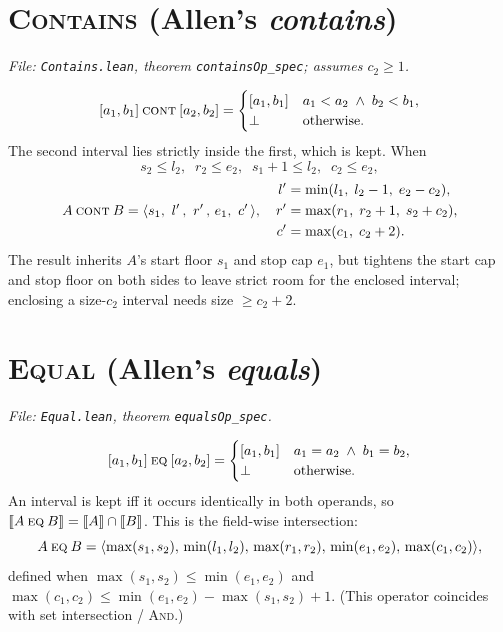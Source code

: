 \documentclass[11pt]{article}
\newcommand{\sem}[1]{\llbracket #1 \rrbracket}            %
\newcommand{\Empty}{\bot}                                 %
\newcommand{\R}[5]{\langle #1,\, #2,\, #3,\, #4,\, #5 \rangle} %
\newcommand{\opname}[1]{\mathbin{\textsc{#1}}}
\newcommand{\Cont}{\opname{cont}}                         %
\newcommand{\Eq}{\opname{eq}}                             %
\theoremstyle{definition}
\theoremstyle{plain}
\begin{document}
\section{\textsc{Contains} (Allen's \emph{contains})}
\label{sec:contains}
\textit{File: \texttt{Contains.lean}, theorem \texttt{containsOp\_spec}; assumes
$c_2\ge1$.}

\[
  [a_1,b_1] \Cont [a_2,b_2] =
  \begin{cases} [a_1,b_1] & a_1 < a_2 \;\wedge\; b_2 < b_1,\\
                \Empty & \text{otherwise.}\end{cases}
\]
The second interval lies strictly inside the first, which is kept.  When
\[
  s_2 \le l_2,\;\; r_2 \le e_2,\;\; s_1+1 \le l_2,\;\; c_2 \le e_2,
\]
\[
  A \Cont B = \R{s_1}{\,l'\,}{\,r'\,}{e_1}{\,c'\,},\quad
  \begin{aligned}
    l' &= \min(l_1,\; l_2-1,\; e_2-c_2),\\
    r' &= \max(r_1,\; r_2+1,\; s_2+c_2),\\
    c' &= \max(c_1,\; c_2+2).
  \end{aligned}
\]
The result inherits $A$'s start floor $s_1$ and stop cap $e_1$, but tightens the
start cap and stop floor on both sides to leave strict room for the enclosed
interval; enclosing a size-$c_2$ interval needs size $\ge c_2+2$.

\section{\textsc{Equal} (Allen's \emph{equals})}
\label{sec:equal}
\textit{File: \texttt{Equal.lean}, theorem \texttt{equalsOp\_spec}.}

\[
  [a_1,b_1] \Eq [a_2,b_2] =
  \begin{cases} [a_1,b_1] & a_1=a_2 \;\wedge\; b_1=b_2,\\
                \Empty & \text{otherwise.}\end{cases}
\]
An interval is kept iff it occurs identically in both operands, so
$\sem{A \Eq B} = \sem{A}\cap\sem{B}$.  This is the field-wise intersection:
\[
  A \Eq B = \R{\max(s_1,s_2)}{\min(l_1,l_2)}{\max(r_1,r_2)}{\min(e_1,e_2)}{\max(c_1,c_2)},
\]
defined when $\max(s_1,s_2)\le\min(e_1,e_2)$ and
$\max(c_1,c_2)\le\min(e_1,e_2)-\max(s_1,s_2)+1$.  (This operator coincides with
set intersection / \textsc{And}.)
\end{document}
